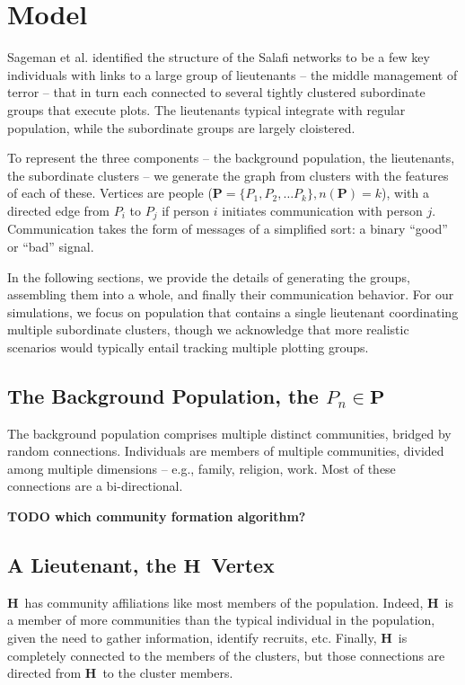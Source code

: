 \documentclass{article}
\newcommand{\Hub}[0]{\ensuremath{\mathbf{H}}}
\begin{document}
\section*{Model}
Sageman et al. identified the structure of the Salafi networks to be a few key individuals with links to a large group of lieutenants -- the middle management of terror -- that in turn each connected to several tightly clustered subordinate groups that execute plots.  The lieutenants typical integrate with regular population, while the subordinate groups are largely cloistered.

To represent the three components -- the background population, the lieutenants, the subordinate clusters -- we generate the graph from clusters with the features of each of these.  Vertices are people ($\mathbf{P}=\{P_1, P_2, \ldots P_k\}, n(\mathbf{P})=k$), with a directed edge from $P_i$ to $P_j$ if person $i$ initiates communication with person $j$.  Communication takes the form of messages of a simplified sort: a binary ``good'' or ``bad'' signal.

In the following sections, we provide the details of generating the groups, assembling them into a whole, and finally their communication behavior.  For our simulations, we focus on population that contains a single lieutenant coordinating multiple subordinate clusters, though we acknowledge that more realistic scenarios would typically entail tracking multiple plotting groups.

\subsection*{The Background Population, the $P_{n}\in\mathbf{P}$}
The background population comprises multiple distinct communities, bridged by random connections.  Individuals are members of multiple communities, divided among multiple dimensions -- e.g., family, religion, work.  Most of these connections are a bi-directional.

\bf{TODO} which community formation algorithm?

\subsection*{A Lieutenant, the \Hub\ Vertex}
\Hub\ has community affiliations like most members of the population.  Indeed, \Hub\ is a member of more communities than the typical individual in the population, given the need to gather information, identify recruits, etc.  Finally, \Hub\ is completely connected to the members of the clusters, but those connections are directed from \Hub\ to the cluster members.
\end{document}
